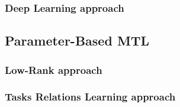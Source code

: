 
\subsubsection*{Deep Learning approach}






\subsection{Parameter-Based MTL}

\subsubsection*{Low-Rank approach}









\subsubsection*{Tasks Relations Learning approach}

